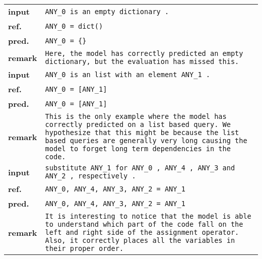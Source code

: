 \documentclass{article}
\begin{document}
  \begin{tabular}{ l p{}}
    \hline
    \textbf{input} & \texttt{ANY\_0 is an empty dictionary .} \\
    \textbf{ref.}  & \texttt{ANY\_0 = dict()} \\
    \textbf{pred.} & \texttt{ANY\_0 = \{\}} \\
    \textbf{remark}& \texttt{Here, the model has correctly predicted an empty dictionary, but
                     the evaluation has missed this. } \\
    \hline
    \textbf{input} & \texttt{ANY\_0 is an list with an element ANY\_1 .} \\
    \textbf{ref.}  & \texttt{ANY\_0 = [ANY\_1]} \\
    \textbf{pred.} & \texttt{ANY\_0 = [ANY\_1]} \\
    \textbf{remark}& \texttt{This is the only example where the model has correctly predicted
                     on a list based query. We hypothesize that this might be because the 
                     list based queries are generally very long causing the model to forget 
                     long term dependencies in the code.} \\
    \hline
    \textbf{input} & \texttt{substitute ANY\_1 for ANY\_0 , ANY\_4 , ANY\_3 and ANY\_2 , 
                     respectively .} \\
    \textbf{ref.}  & \texttt{ANY\_0, ANY\_4, ANY\_3, ANY\_2 = ANY\_1} \\
    \textbf{pred.} & \texttt{ANY\_0, ANY\_4, ANY\_3, ANY\_2 = ANY\_1} \\
    \textbf{remark}& \texttt{It is interesting to notice that the model is able to understand
                     which part of the code fall on the left and right side of the assignment
                     operator. Also, it correctly places all the variables in their 
                     proper order. } \\
    \hline
  \end{tabular}
\end{document}
